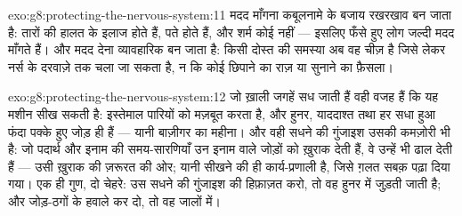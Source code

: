 \begin{solution}{exo:g8:protecting-the-nervous-system:11}
मदद माँगना कबूलनामे के बजाय रखरखाव बन जाता है: तारों की हालत के इलाज
होते हैं, पते होते हैं, और शर्म कोई नहीं --- इसलिए फँसे हुए लोग जल्दी
मदद माँगते हैं। और मदद देना व्यावहारिक बन जाता है: किसी दोस्त की समस्या
अब वह चीज़ है जिसे लेकर नर्स के दरवाज़े तक चला जा सकता है, न कि कोई
छिपाने का राज़ या सुनाने का फ़ैसला।
\end{solution}

\begin{solution}{exo:g8:protecting-the-nervous-system:12}
जो ख़ाली जगहें सध जाती हैं वही वजह हैं कि यह मशीन सीख सकती है: इस्तेमाल
पारियों को मज़बूत करता है, और हुनर, याददाश्त तथा हर सधा हुआ फंदा पक्के
हुए जोड़ ही हैं --- यानी बाज़ीगर का महीना। और वही सधने की गुंजाइश उसकी
कमज़ोरी भी है: जो पदार्थ और इनाम की समय-सारणियाँ उन इनाम वाले जोड़ों को
ख़ुराक देती हैं, वे उन्हें भी ढाल देती हैं --- उसी ख़ुराक की ज़रूरत की
ओर; यानी  सीखने की ही कार्य-प्रणाली है, जिसे ग़लत सबक़ पढ़ा दिया गया।
एक ही गुण, दो चेहरे: उस सधने की गुंजाइश की हिफ़ाज़त करो, तो वह हुनर में
जुड़ती जाती है; और जोड़-ठगों के हवाले कर दो, तो वह जालों में।
\end{solution}

